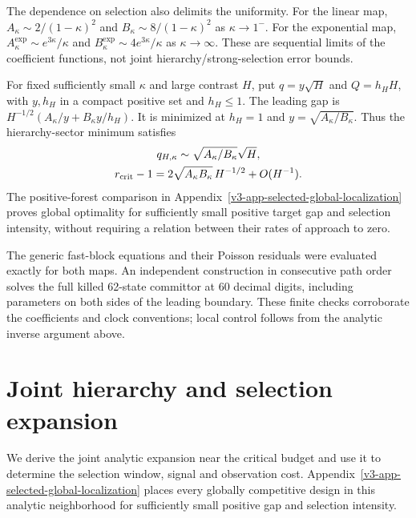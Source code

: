 \documentclass[aps,pre,reprint,amsmath,amssymb,longbibliography]{revtex4-2}
\begin{document}
The dependence on selection also
delimits the uniformity. For the linear
map, \(A_\kappa\sim2/(1-\kappa)^2\)
and \(B_\kappa\sim8/(1-\kappa)^2\)
as \(\kappa\to1^-\).
For the exponential map,
\(A_\kappa^{\exp}\sim e^{3\kappa}/\kappa\)
and \(B_\kappa^{\exp}\sim4e^{3\kappa}/\kappa\)
as \(\kappa\to\infty\).
These are sequential limits of the
coefficient functions, not joint
hierarchy/strong-selection error bounds.

For fixed sufficiently small $\kappa$ and large contrast $H$, put
$q=y\sqrt H$ and $Q=h_HH$, with $y,h_H$ in a compact positive set
and $h_H\le1$. The leading gap is
$H^{-1/2}(A_\kappa/y+B_\kappa y/h_H)$.
It is minimized at $h_H=1$ and $y=\sqrt{A_\kappa/B_\kappa}$.
Thus the hierarchy-sector minimum satisfies
\begin{equation}
 \begin{gathered}
 q_{H,\kappa}\sim\sqrt{A_\kappa/B_\kappa}\sqrt H,\\
 r_{\rm crit}-1=2\sqrt{A_\kappa B_\kappa}\,H^{-1/2}+O(H^{-1}).
 \end{gathered}
 \label{eq:selected-design-v2}
\end{equation}
The positive-forest comparison in
Appendix~\ref{v3-app-selected-global-localization} proves global
optimality for sufficiently small positive target gap and selection
intensity, without requiring a relation between their rates of approach
to zero.

The generic fast-block equations and their Poisson residuals were evaluated
exactly for both maps. An independent construction in consecutive path order
solves the full killed 62-state committor at 60 decimal digits, including
parameters on both sides of the leading boundary. These finite checks
corroborate the coefficients and clock conventions; local control follows
from the analytic inverse argument above.

\section{Joint hierarchy and selection expansion}
\label{app:v3-joint-selection}

We derive the joint analytic expansion near the critical budget and
use it to determine the selection window, signal and observation cost.
Appendix~\ref{v3-app-selected-global-localization} places every globally
competitive design in this analytic neighborhood for sufficiently small
positive gap and selection intensity.
\end{document}
